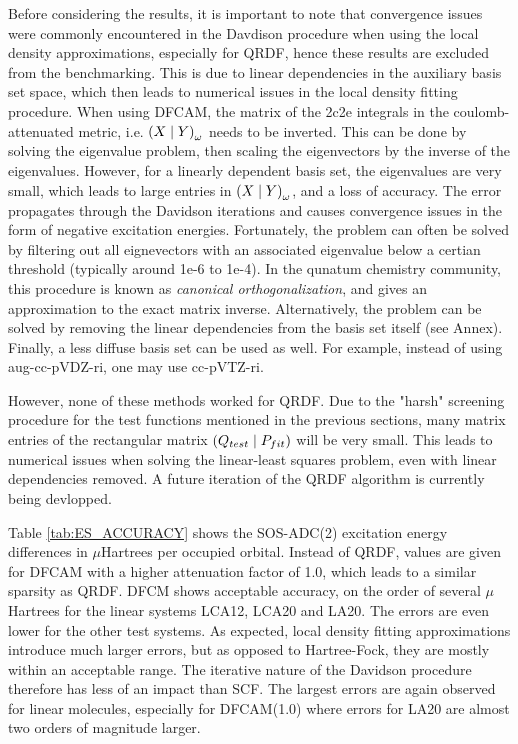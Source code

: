 
Before considering the results, it is important to note that convergence issues were commonly encountered in the Davdison procedure when using the local density approximations, especially for QRDF, hence these results are excluded from the benchmarking. This is due to linear dependencies in the auxiliary basis set space, which then leads to numerical issues in the local density fitting procedure. When using DFCAM, the matrix of the 2c2e integrals in the coulomb-attenuated metric, i.e. $\left( X \mid Y \right)_{\omega}$ needs to be inverted. This can be done by solving the eigenvalue problem, then scaling the eigenvectors by the inverse of the eigenvalues. However, for a linearly dependent basis set, the eigenvalues are very small, which leads to large entries in $\left( X \mid Y \right)_{\omega}$, and a loss of accuracy. The error propagates through the Davidson iterations and causes convergence issues in the form of negative excitation energies. Fortunately, the problem can often be solved by filtering out all eignevectors with an associated eigenvalue below a certian threshold (typically around 1e-6 to 1e-4). In the qunatum chemistry community, this procedure is known as \emph{canonical orthogonalization}, and gives an approximation to the exact matrix inverse. Alternatively, the problem can be solved by removing the linear dependencies from the basis set itself (see Annex). Finally, a less diffuse basis set can be used as well. For example, instead of using aug-cc-pVDZ-ri, one may use cc-pVTZ-ri.

However, none of these methods worked for QRDF. Due to the "harsh" screening procedure for the test functions mentioned in the previous sections, many matrix entries of the rectangular matrix $\left( Q_{test} \mid P_{fit} \right)$ will be very small. This leads to numerical issues when solving the linear-least squares problem, even with linear dependencies removed. A future iteration of the QRDF algorithm is currently being devlopped.

Table \ref{tab:ES_ACCURACY} shows the SOS-ADC(2) excitation energy differences in $\mu$Hartrees per occupied orbital. Instead of QRDF, values are given for DFCAM with a higher attenuation factor of 1.0, which leads to a similar sparsity as QRDF. DFCM shows acceptable accuracy, on the order of several $\mu$Hartrees for the linear systems LCA12, LCA20 and LA20. The errors are even lower for the other test systems. As expected, local density fitting approximations introduce much larger errors, but as opposed to Hartree-Fock, they are mostly within an acceptable range. The iterative nature of the Davidson procedure therefore has less of an impact than SCF. The largest errors are again observed for linear molecules, especially for DFCAM(1.0) where errors for LA20 are almost two orders of magnitude larger.  

